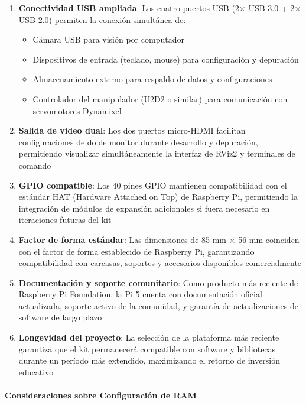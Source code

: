 \begin{enumerate}
    \item \textbf{Conectividad USB ampliada}: Los cuatro puertos USB (2× USB 3.0 + 2× USB 2.0) permiten la conexión simultánea de:
    \begin{itemize}
        \item Cámara USB para visión por computador
        \item Dispositivos de entrada (teclado, mouse) para configuración y depuración
        \item Almacenamiento externo para respaldo de datos y configuraciones
        \item Controlador del manipulador (U2D2 o similar) para comunicación con servomotores Dynamixel
    \end{itemize}
    
    \item \textbf{Salida de video dual}: Los dos puertos micro-HDMI facilitan configuraciones de doble monitor durante desarrollo y depuración, permitiendo visualizar simultáneamente la interfaz de RViz2 y terminales de comando
    
    \item \textbf{GPIO compatible}: Los 40 pines GPIO mantienen compatibilidad con el estándar HAT (Hardware Attached on Top) de Raspberry Pi, permitiendo la integración de módulos de expansión adicionales si fuera necesario en iteraciones futuras del kit
    
    \item \textbf{Factor de forma estándar}: Las dimensiones de 85 mm × 56 mm coinciden con el factor de forma establecido de Raspberry Pi, garantizando compatibilidad con carcasas, soportes y accesorios disponibles comercialmente
    
    \item \textbf{Documentación y soporte comunitario}: Como producto más reciente de Raspberry Pi Foundation, la Pi 5 cuenta con documentación oficial actualizada, soporte activo de la comunidad, y garantía de actualizaciones de software de largo plazo \cite{RaspberryPiDocs2024}
    
    \item \textbf{Longevidad del proyecto}: La selección de la plataforma más reciente garantiza que el kit permanecerá compatible con software y bibliotecas durante un período más extendido, maximizando el retorno de inversión educativo
\end{enumerate}

\paragraph{Consideraciones sobre Configuración de RAM}

